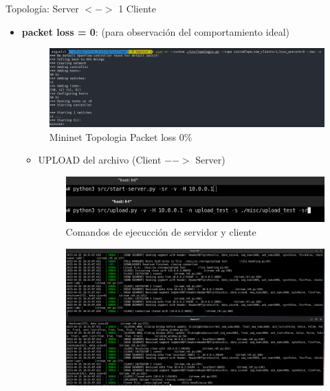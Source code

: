 \documentclass[11pt,a4paper]{article}
\begin{document}
Topología: Server $<->$ 1 Cliente \\
    \begin{itemize}
        \item \textbf{packet loss = 0}: (para observación del    comportamiento ideal)
            \begin{figure}[H]
                \begin{center}
                \includegraphics[width=18cm]{images/tests/t1/T1_loss0.png}
                \end{center}
                \caption{Mininet Topologia Packet loss $0\%$ }
            \end{figure}
            \begin{itemize}
                \item UPLOAD del archivo (Client $-->$ Server)
                \begin{figure}[H]
                    \begin{center}
                    \includegraphics[width=18cm]{images/tests/t1/upload/T1_comandos_upload.png}
                    \end{center}
                    \caption{Comandos de ejecucci\'{o}n de servidor y cliente}
                \end{figure}
                \begin{figure}[H]
                    \begin{center}
                    \includegraphics[width=18cm]{images/tests/t1/upload/T1_2.2_upload_SR_loss0.png}

\end{center}
\end{figure}
\end{itemize}
\end{itemize}
\end{document}
